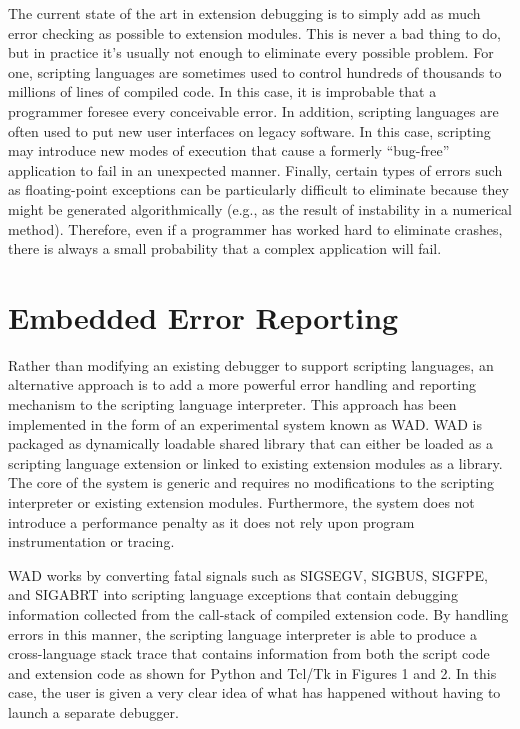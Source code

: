The current state of the art in extension debugging is to simply add
as much error checking as possible to extension modules. This is never
a bad thing to do, but in practice it's usually not enough to
eliminate every possible problem.  For one, scripting languages are
sometimes used to control hundreds of thousands to millions of lines
of compiled code.  In this case, it is improbable that a programmer
foresee every conceivable error.  In addition, scripting languages are
often used to put new user interfaces on legacy software. In this
case, scripting may introduce new modes of execution that cause a
formerly ``bug-free'' application to fail in an unexpected manner.
Finally, certain types of errors such as floating-point exceptions can
be particularly difficult to eliminate because they might be generated
algorithmically (e.g., as the result of instability in a numerical
method). Therefore, even if a programmer has worked hard to eliminate
crashes, there is always a small probability that a complex
application will fail.

\section{Embedded Error Reporting}

Rather than modifying an existing debugger to support scripting
languages, an alternative approach is to add a more powerful error
handling and reporting mechanism to the scripting language
interpreter.  This approach has been implemented in the form of an
experimental system known as WAD.  WAD is packaged as dynamically
loadable shared library that can either be loaded as a scripting
language extension or linked to existing extension modules as a
library.  The core of the system is generic and requires no
modifications to the scripting interpreter or existing extension
modules.  Furthermore, the system does not introduce a performance
penalty as it does not rely upon program instrumentation or tracing.

WAD works by converting fatal signals such as SIGSEGV,
SIGBUS, SIGFPE, and SIGABRT into scripting language exceptions that contain
debugging information collected from the call-stack of compiled
extension code.  By handling errors in this manner, the scripting
language interpreter is able to produce a cross-language stack trace that
contains information from both the script code and extension code as
shown for Python and Tcl/Tk in Figures 1 and 2.  In this case, the user
is given a very clear idea of what has happened without having
to launch a separate debugger. 

